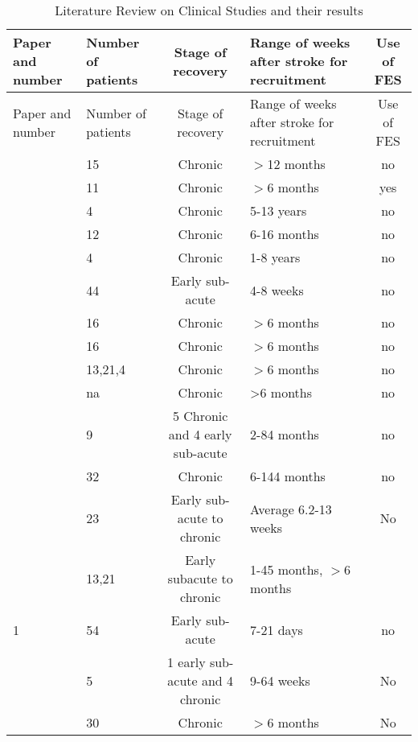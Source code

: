 \begin{longtable}{|p{3cm}||p{2cm}|c|p{3cm}|c|}
	\caption{Literature Review on Clinical Studies and their results}
	\label{tab:reviewclincal}\\
	\hline 	Paper and number & Number of patients & Stage of recovery & Range of weeks after stroke for recruitment & Use of FES \\
	\hline\hline
	\endfirsthead
	\hline 	Paper and number & Number of patients & Stage of recovery & Range of weeks after stroke for recruitment & Use of FES \\
	\hline\hline
	\endhead
	
	
	\cite{Lewis2009} & 15 & Chronic & $>$12 months & no \bigstrut\\
	\hline
	\cite{Johnson2011} & 11 & Chronic & $>$6 months & yes \bigstrut\\
	\hline
	\cite{Trlep2011} & 4  & Chronic & 5-13 years & no \bigstrut\\
	\hline
	\cite{Hesse2003} & 12 & Chronic & 6-16 months & no \bigstrut\\
	\hline
	\cite{Adamovich2009} & 4  & Chronic & 1-8 years & no \bigstrut\\
	\hline
	\cite{Hesse2005} & 44 & Early sub-acute & 4-8 weeks & no \bigstrut\\
	\hline
	\cite{Whitall2000} & 16 & Chronic & $>$6 months & no \bigstrut\\
	\hline
	\cite{King2010} & 16 & Chronic & $>$6 months & no \bigstrut\\
	\hline
	\cite{Mahoney2003}  &13,21,4 & Chronic & $>$6 months & no \bigstrut\\
	\hline
	\cite{Liu2010} & na & Chronic &>6 months & no \bigstrut\\
	\hline
	\cite{Stinear2004} & 9  & 5 Chronic and 4 early sub-acute & 2-84 months & no \bigstrut\\
	\hline
	\cite{Stinear2008} & 32 & Chronic & 6-144 months & no \bigstrut\\
	\hline
	\cite{Lum2005} & 23 & Early sub-acute to chronic & Average 6.2-13 weeks & No \bigstrut\\
	\hline
	\cite{Burgar2000} & 13,21 & Early subacute to chronic & 1-45 months, $>$6 months &  \bigstrut\\
	\hline
	\cite{Burgar2011}1 & 54 & Early sub-acute & 7-21 days  & no \bigstrut\\
	\hline
	\cite{Sampson2012} & 5  & 1 early sub-acute and 4 chronic & 9-64 weeks & No  \bigstrut\\
	\hline
	\cite{Lum2002} & 30 & Chronic & $>$6 months & No \bigstrut\\

\end{longtable}
